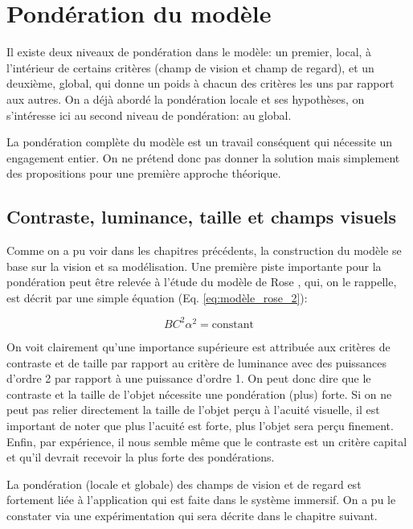 \chapter{Pondération du modèle}

\par Il existe deux niveaux de pondération dans le modèle: un premier, local, à l'intérieur de certains critères (champ de vision et champ de regard), et un deuxième, global, qui donne un poids à chacun des critères les uns par rapport aux autres. On a déjà abordé la pondération locale et ses hypothèses, on s'intéresse ici au second niveau de pondération: au global.

\par La pondération complète du modèle est un travail conséquent qui nécessite un engagement entier. On ne prétend donc pas donner la solution mais simplement des propositions pour une première approche théorique.

\section{Contraste, luminance, taille et champs visuels}
\par Comme on a pu voir dans les chapitres précédents, la construction du modèle se base sur la vision et sa modélisation. Une première piste importante pour la pondération peut être relevée à l'étude du modèle de Rose \citep{rose_sensitivity_1948}, qui, on le rappelle, est décrit par une simple équation (Eq. \ref{eq:modèle_rose_2}):

\begin{equation}
	BC^2\alpha^2 = \text{constant}
	\label{eq:modèle_rose_2} 
\end{equation}

\par On voit clairement qu'une importance supérieure est attribuée aux critères de contraste et de taille par rapport au critère de luminance avec des puissances d'ordre 2 par rapport à une puissance d'ordre 1. On peut donc dire que le contraste et la taille de l'objet nécessite une pondération (plus) forte. Si on ne peut pas relier directement la taille de l'objet perçu à l'acuité visuelle, il est important de noter que plus l'acuité est forte, plus l'objet sera perçu finement. Enfin, par expérience, il nous semble même que le contraste est un critère capital et qu'il devrait recevoir la plus forte des pondérations.

\par La pondération (locale et globale) des champs de vision et de regard est fortement liée à l'application qui est faite dans le système immersif. On a pu le constater via une expérimentation qui sera décrite dans le chapitre suivant.

